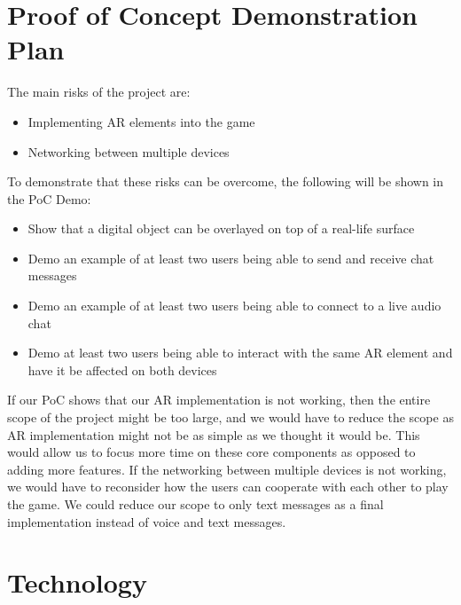 \documentclass{article}
\begin{document}
\section{Proof of Concept Demonstration Plan}
The main risks of the project are:
\begin{itemize}
    \item Implementing AR elements into the game
    \item Networking between multiple devices
\end{itemize}
To demonstrate that these risks can be overcome, the following will be shown in the PoC Demo:
\begin{itemize}
    \item Show that a digital object can be overlayed on top of a real-life surface 
    \item Demo an example of at least two users being able to send and receive chat messages
    \item Demo an example of at least two users being able to connect to a live audio chat
    \item Demo at least two users being able to interact with the same AR element and have it be affected on both devices
\end{itemize}
If our PoC shows that our AR implementation is not working, then the entire scope of the project might be too large, and we would have to reduce the scope as AR implementation might not be as simple as we thought it would be. This would allow us to focus more time on these core components as opposed to adding more features.
If the networking between multiple devices is not working, we would have to reconsider how the users can cooperate with each other to play the game. We could reduce our scope to only text messages as a final implementation instead of voice and text messages. 



\section{Technology}
\end{document}
